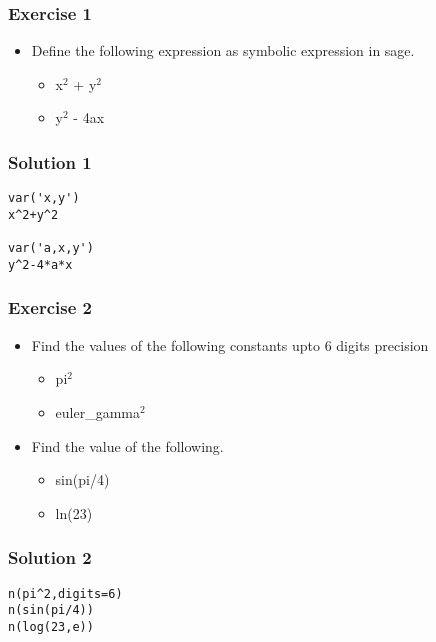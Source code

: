 \documentclass[17pt,compress]{beamer}
\begin{document}
\begin{frame}
\frametitle{Exercise 1}
\label{sec-4}


\begin{itemize}
\item Define the following expression as symbolic expression in sage.\pause
	\begin{itemize}
	\item x$^2$ + y$^2$
	\item y$^2$ - 4ax
	\end{itemize}
\end{itemize}
 
\end{frame}
\begin{frame}[fragile]
\frametitle{Solution 1}
\label{sec-5}

\lstset{language=Python}
\begin{lstlisting}
var('x,y')
x^2+y^2

var('a,x,y')
y^2-4*a*x
\end{lstlisting}
\end{frame}
\begin{frame}
\frametitle{Exercise 2}
\label{sec-6}


\begin{itemize}
\item Find the values of the following constants upto 6 digits  precision
	\begin{itemize}
	\item pi$^2$
	\item euler\_gamma$^2$
	\end{itemize}
\end{itemize}\pause

\begin{itemize}
\item Find the value of the following.
	\begin{itemize}
	\item sin(pi/4)
	\item ln(23)
	\end{itemize}
\end{itemize}
\end{frame}
\begin{frame}[fragile]
\frametitle{Solution 2}
\label{sec-7}

\lstset{language=Python}
\begin{lstlisting}
n(pi^2,digits=6)
n(sin(pi/4))
n(log(23,e))
\end{lstlisting}
\end{frame}
\end{document}
